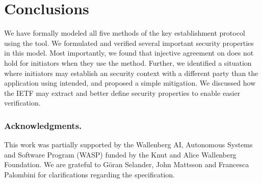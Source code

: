 \documentclass[runningheads, envcountsame, a4paper, draft, x11names]{llncs}
\begin{document}
\section{Conclusions}
\label{sec:conclusions}
 
We have formally modeled all five
methods of the \mEdhoc{} key establishment protocol using the \mTamarin{} tool.
%
We formulated and verified several important security properties in this model.
%
%
Most importantly, we found that injective agreement on \mGiy{} does not hold for
initiators when they use the \mStat{} method.
%
Further, we identified a situation where initiators may establish an \mOscore{}
security context with a different party than the application using \mEdhoc{}
intended, and proposed a simple mitigation.
%
We discussed how the IETF may extract and better define security properties to
enable easier verification.
%

 
\subsubsection*{Acknowledgments.} This work was partially supported by
the Wallenberg AI, Autonomous Systems and Software Program (WASP) funded by
the Knut and Alice Wallenberg Foundation.
%
We are grateful to G\"oran Selander, John Mattsson and Francesca Palombini for
clarifications regarding the specification.
%


 


\end{document}
